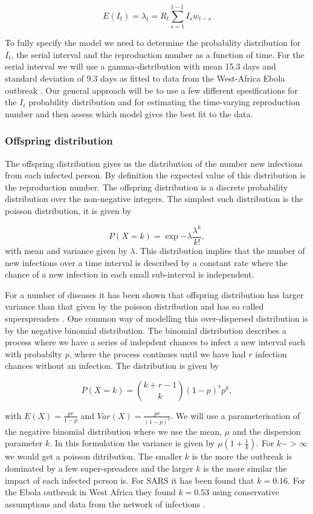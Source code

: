 \documentclass[12pt]{article}
\begin{document}
\[ E(I_t) = \lambda_t =  R_t \sum^{t-1}_{s=1} I_s w_{t-s}\]

To fully specify the model we need to determine the probability distribution for $I_t$, the serial interval and the reproduction number as a function of time. For the serial interval we will use  a gamma-distribution with mean 15.3 days and standard deviation of 9.3 days as fitted to data from the West-Africa Ebola outbreak \cite{EbolaVirusDisease2014}. Our general approach will be to use a few different spesifications for the $I_t$ probability distribution and for estimating the time-varying reproduction number and then assess which model gives the best fit to the data. 
\subsubsection{Offspring distribution}
The offspring distribution gives us the distribution of the number new infections from each infected person. By definition the expected value of this distribution is the reproduction number. The offspring distribution is a discrete probability distribution over the non-negative integers. The simplest such distribution is the poisson distribution, it is given by

\[P(X=k) = \exp{-\lambda}\frac{\lambda^k}{k!}, \]
with mean and variance given by $\lambda$. This distribution implies that the number of new infections over a time interval is described by a constant rate where the chance of a new infection in each small sub-interval is independent.

For a number of diseases it has been shown that offspring distribution has larger variance than that given by the poisson distribution and has so called superspreaders \cite{lloyd-smithSuperspreadingEffectIndividual2005}. One common way of modelling this over-dispersed distribution is by the negative binomial distribution. The binomial distribution describes a process where we have a series of indepdent chances to infect a new interval each with probabilty $p$, where the process continues until we have had $r$ infection chances without an infection. The distribution is given by

\[P(X=k) = {k + r - 1 \choose k} (1-p)^rp^k, \]

with $E(X)=\frac{pr}{1-p}$ and $Var(X) = \frac{pr}{(1-p)^2}$. We will use a parameterisation of the negative binomial distribution where we use the mean, $\mu$ and the dispersion parameter $k$. In this formulation the variance is given by $\mu(1 + \frac{1}{k})$. For $k->\infty$ we would get a poisson ditribution. The smaller $k$ is the more the outbreak is dominated by a few super-spreaders and the larger $k$ is the more similar the impact of each infected person is. For SARS it has been found that $k=0.16$\cite{lloyd-smithSuperspreadingEffectIndividual2005}. For the Ebola outbreak in West Africa they found $k=0.53$ using conservative assumptions and data from the network of infections \cite{internationalebolaresponseteamExposurePatternsDriving2016}.
\end{document}
